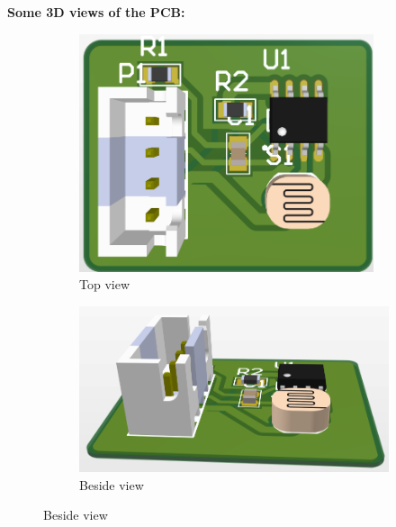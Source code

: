 \textbf{Some 3D views of the PCB:}
\begin{figure}[h!]
    \centering
    \begin{subfigure}{0.495\textwidth}
        \centering
        \includegraphics[width=0.95\textwidth]{graphics/ex4/f9.png}
        \caption*{Top view}
    \end{subfigure}
    \hfill
    \begin{subfigure}{0.495\textwidth}
        \centering
        \includegraphics[width=\textwidth]{graphics/ex4/f10.png}
        \caption*{Beside view}
    \end{subfigure}
\end{figure}